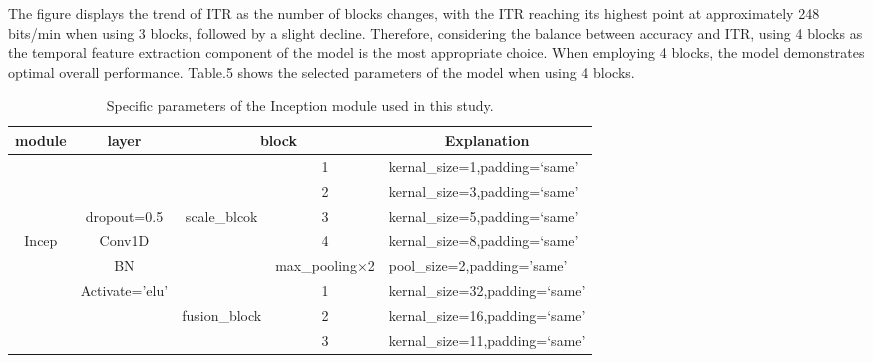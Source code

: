\documentclass[10pt]{iopart}
\begin{document}
The figure displays the trend of ITR as the number of blocks changes, with the ITR reaching its highest point at approximately 248 bits/min when using 3 blocks, followed by a slight decline. Therefore, considering the balance between accuracy and ITR, using 4 blocks as the temporal feature extraction component of the model is the most appropriate choice. When employing 4 blocks, the model demonstrates optimal overall performance. Table.5 shows the selected parameters of the model when using 4 blocks.

\begin{table*}[htbp]
\begin{center}
\caption{Specific parameters of the Inception module used in this study.}
\begin{tabular}{c|c|cc|l}
\hline
module & layer          & \multicolumn{2}{c|}{block}                          & \multicolumn{1}{c}{Explanation} \\ \hline
       &                & \multicolumn{1}{c|}{}              & 1              & kernal\_size=1,padding=‘same’   \\ \cline{4-5} 
       &                & \multicolumn{1}{c|}{}              & 2              & kernal\_size=3,padding=‘same’   \\ \cline{4-5} 
       & dropout=0.5    & \multicolumn{1}{c|}{scale\_blcok}  & 3              & kernal\_size=5,padding=‘same’   \\ \cline{4-5} 
Incep  & Conv1D         & \multicolumn{1}{c|}{}              & 4              & kernal\_size=8,padding=‘same’   \\ \cline{3-5} 
       & BN             & \multicolumn{1}{c|}{}              & max\_pooling×2 & pool\_size=2,padding='same'     \\ \cline{4-5} 
       & Activate='elu' & \multicolumn{1}{c|}{}              & 1              & kernal\_size=32,padding=‘same’  \\ \cline{4-5} 
       &                & \multicolumn{1}{c|}{fusion\_block} & 2              & kernal\_size=16,padding=‘same’  \\ \cline{4-5} 
       &                & \multicolumn{1}{c|}{\textbf{}}     & 3              & kernal\_size=11,padding=‘same’  \\ \hline
\end{tabular}
\end{center}
\end{table*}
\end{document}
